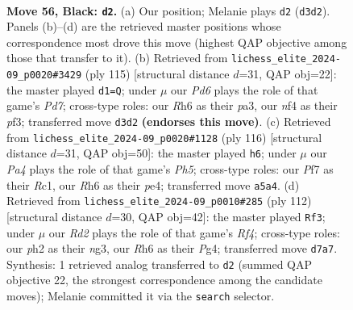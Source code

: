 \documentclass[11pt]{article}
\begin{document}
\clearpage

\begin{figure}[p]\centering
\begin{subfigure}{0.46\textwidth}\centering
\resizebox{\linewidth}{!}{%
\newchessgame
\chessboard[
  setfen={5k2/3r1p2/7r/p7/4KN2/1P1p4/R6P/2R5 b - - 1 56},
  showmover=false,
  pgfstyle=straightmove, color=movearrow, markmove={d3-d2}
]}
\caption{}
\end{subfigure}\hfill
\begin{subfigure}{0.46\textwidth}\centering
\resizebox{\linewidth}{!}{%
\newchessgame
\chessboard[
  setfen={8/pp1r2p1/8/8/k7/P3KP1P/3p4/1R6 b - - 3 58},
  showmover=false,
  pgfstyle=straightmove, color=movearrow, markmove={d2-d1}
]}
\caption{}
\end{subfigure}
\\[4pt]
\begin{subfigure}{0.46\textwidth}\centering
\resizebox{\linewidth}{!}{%
\newchessgame
\chessboard[
  setfen={7r/2Pk4/4n3/1N3p1P/4p3/8/5K2/2R5 w - - 1 59},
  showmover=false,
  pgfstyle=straightmove, color=movearrow, markmove={h5-h6}
]}
\caption{}
\end{subfigure}\hfill
\begin{subfigure}{0.46\textwidth}\centering
\resizebox{\linewidth}{!}{%
\newchessgame
\chessboard[
  setfen={8/4Pk2/5Pp1/2r5/5RP1/2P3n1/4r3/6K1 w - - 0 57},
  showmover=false,
  pgfstyle=straightmove, color=movearrow, markmove={f4-f3}
]}
\caption{}
\end{subfigure}
\caption{\textbf{Move 56, Black: \texttt{d2}.} (a) Our position; Melanie plays \texttt{d2} (\texttt{d3d2}). Panels (b)--(d) are the retrieved master positions whose correspondence most drove this move (highest QAP objective among those that transfer to it). (b) Retrieved from \texttt{lichess\_elite\_2024-09\_p0020\#3429} (ply 115) [structural distance $d$=31, QAP obj=22]: the master played \texttt{d1=Q}; under $\mu$ our \emph{Pd6} plays the role of that game's \emph{Pd7}; cross-type roles: our \emph{R}h6 as their \emph{p}a3, our \emph{n}f4 as their \emph{p}f3; transferred move \texttt{d3d2} \textbf{(endorses this move)}. (c) Retrieved from \texttt{lichess\_elite\_2024-09\_p0020\#1128} (ply 116) [structural distance $d$=31, QAP obj=50]: the master played \texttt{h6}; under $\mu$ our \emph{Pa4} plays the role of that game's \emph{Ph5}; cross-type roles: our \emph{P}f7 as their \emph{R}c1, our \emph{R}h6 as their \emph{p}e4; transferred move \texttt{a5a4}. (d) Retrieved from \texttt{lichess\_elite\_2024-09\_p0010\#285} (ply 112) [structural distance $d$=30, QAP obj=42]: the master played \texttt{Rf3}; under $\mu$ our \emph{Rd2} plays the role of that game's \emph{Rf4}; cross-type roles: our \emph{p}h2 as their \emph{n}g3, our \emph{R}h6 as their \emph{P}g4; transferred move \texttt{d7a7}. Synthesis: 1 retrieved analog transferred to \texttt{d2} (summed QAP objective 22, the strongest correspondence among the candidate moves); Melanie committed it via the \texttt{search} selector.}
\label{fig:thought-m111}
\end{figure}
\end{document}
